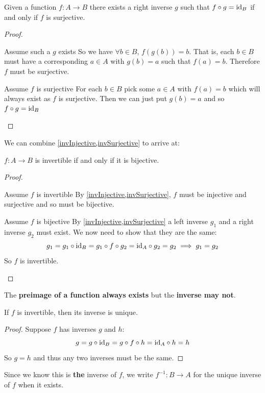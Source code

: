 \documentclass[../main.tex]{subfiles}
\begin{document}
\begin{proposition}
  Given a function $f: A \to B$ there exists a right inverse $g$ such that $f \circ g = \mathrm{id}_B$ if and only if $f$ is surjective.
  \label{invSurjective}
\end{proposition}
\begin{proof}
  \begin{proofdirection}{Assume such a $g$ exists}
    So we have $\forall b \in B$, $f(g(b)) = b$.
    That is, each $b \in B$ must have a corresponding $a \in A$ with $g(b) = a$ such that $f(a) = b$.
    Therefore $f$ must be surjective.
  \end{proofdirection}
  \begin{proofdirection}{Assume $f$ is surjective}
    For each $b \in B$ pick some $a \in A$ with $f(a) = b$ which will always exist as $f$ is surjective.
    Then we can just put $g(b) = a$ and so $f \circ g = \mathrm{id}_B$
  \end{proofdirection}
\end{proof}

We can combine \cref{invInjective,invSurjective} to arrive at:
\begin{proposition}
  $f: A \to B$ is invertible if and only if it is bijective.
\end{proposition}
\begin{proof}
  \begin{proofdirection}{Assume $f$ is invertible}
    By \cref{invInjective,invSurjective}, $f$ must be injective and surjective and so must be bijective.
  \end{proofdirection}
  \begin{proofdirection}{Assume $f$ is bijective}
    By \cref{invInjective,invSurjective} a left inverse $g_1$ and a right inverse $g_2$ must exist.
    We now need to show that they are the same:
    \[
      g_1 = g_1 \circ \mathrm{id}_B = g_1 \circ f \circ g_2 = \mathrm{id}_A \circ g_2 = g_2 \implies g_1 = g_2
    \]
    So $f$ is invertible.
  \end{proofdirection}
\end{proof}
\begin{remark}[Warning]
  The \textbf{preimage of a function always exists} but the \textbf{inverse may not}.
\end{remark}
\begin{lemma}
  If $f$ is invertible, then its inverse is unique.
\end{lemma}
\begin{proof}
  Suppose $f$ has inverses $g$ and $h$:
  \[
    g = g \circ \mathrm{id}_B = g \circ f \circ h = \mathrm{id}_A \circ h = h
  \]
  So $g = h$ and thus any two inverses must be the same.
\end{proof}
\begin{remark}[Notation]
  Since we know this is \textbf{the} inverse of $f$, we write $f^{-1}: B \to A$ for the unique inverse of $f$ when it exists.
\end{remark}
\end{document}
